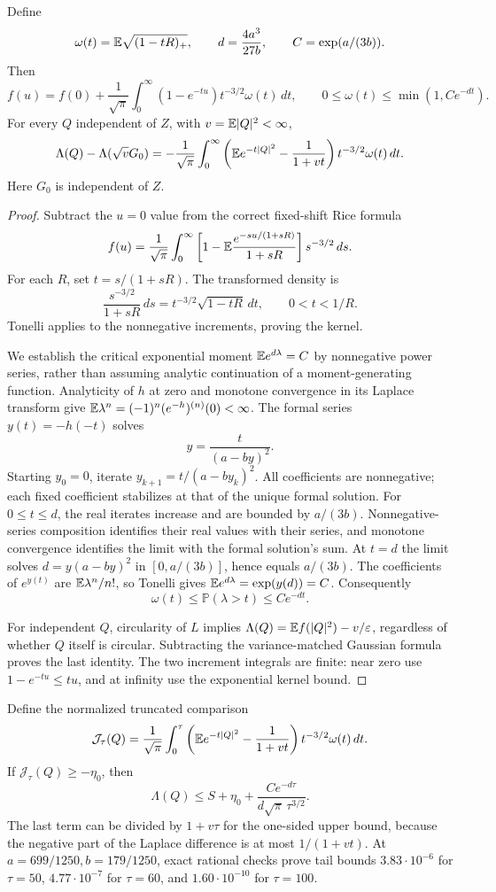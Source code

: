 \begin{theorem}
Define
\[
\omega(t)=\mathbb E\sqrt{(1-tR)_+},\qquad
d=\frac{4a^3}{27b},\qquad C=\exp(a/(3b)).
\]
Then
\[
f(u)=f(0)+\frac1{\sqrt\pi}\int_0^\infty
 (1-e^{-tu})t^{-3/2}\omega(t)\,dt,\qquad
0\le\omega(t)\le\min(1,Ce^{-dt}).
\]
For every \(Q\) independent of \(Z\), with \(v=\mathbb E|Q|^2<\infty\),
\[
\Lambda(Q)-\Lambda(\sqrt vG_0)
=-\frac1{\sqrt\pi}\int_0^\infty
\left(\mathbb E e^{-t|Q|^2}-\frac1{1+vt}\right)
t^{-3/2}\omega(t)\,dt .
\]
Here \(G_0\) is independent of \(Z\).
\end{theorem}
\begin{proof}
Subtract the \(u=0\) value from the correct fixed-shift Rice formula
\[
f(u)=\frac1{\sqrt\pi}\int_0^\infty
\left[1-\mathbb E\frac{e^{-su/(1+sR)}}{1+sR}\right]s^{-3/2}\,ds.
\]
For each \(R\), set \(t=s/(1+sR)\). The transformed density is
\[
\frac{s^{-3/2}}{1+sR}\,ds
=t^{-3/2}\sqrt{1-tR}\,dt,\qquad 0<t<1/R.
\]
Tonelli applies to the nonnegative increments, proving the kernel.

We establish the critical exponential moment
\(\mathbb E e^{d\lambda}=C\) by nonnegative power series, rather than
assuming analytic continuation of a moment-generating function.
Analyticity of \(h\) at zero and monotone convergence in its Laplace
transform give
\(\mathbb E\lambda^n=(-1)^n(e^{-h})^{(n)}(0)<\infty\).
The formal series \(y(t)=-h(-t)\) solves
\[
y=\frac{t}{(a-by)^2}.
\]
Starting \(y_0=0\), iterate
\(y_{k+1}=t/(a-by_k)^2\). All coefficients are nonnegative;
each fixed coefficient stabilizes at that of the unique formal
solution. For \(0\le t\le d\), the real iterates increase and are
bounded by \(a/(3b)\). Nonnegative-series composition identifies
their real values with their series, and monotone convergence
identifies the limit with the formal solution's sum. At \(t=d\)
the limit solves \(d=y(a-by)^2\) in \([0,a/(3b)]\), hence equals
\(a/(3b)\). The coefficients of \(e^{y(t)}\) are
\(\mathbb E\lambda^n/n!\), so Tonelli gives
\(\mathbb E e^{d\lambda}=\exp(y(d))=C\).
Consequently
\[
\omega(t)\le\mathbb P(\lambda>t)\le Ce^{-dt}.
\]

For independent \(Q\), circularity of \(L\) implies
\(\Lambda(Q)=\mathbb E f(|Q|^2)-v/\varepsilon\), regardless of whether \(Q\)
itself is circular. Subtracting the variance-matched Gaussian
formula proves the last identity. The two increment integrals are
finite: near zero use \(1-e^{-tu}\le tu\), and at infinity use the
exponential kernel bound.
\end{proof}

Define the normalized truncated comparison
\[
\mathcal J_\tau(Q)=\frac1{\sqrt\pi}\int_0^\tau
\left(\mathbb E e^{-t|Q|^2}-\frac1{1+vt}\right)
t^{-3/2}\omega(t)\,dt.
\]
If \(\mathcal J_\tau(Q)\ge-\eta_0\), then
\[
\Lambda(Q)\le S+\eta_0+
\frac{Ce^{-d\tau}}{d\sqrt\pi\,\tau^{3/2}}.
\]
The last term can be divided by \(1+v\tau\) for the one-sided
upper bound, because the negative part of the Laplace difference
is at most \(1/(1+vt)\).
At \(a=699/1250,b=179/1250\), exact rational checks prove tail
bounds \(3.83\cdot10^{-6}\) for \(\tau=50\),
\(4.77\cdot10^{-7}\) for \(\tau=60\), and
\(1.60\cdot10^{-10}\) for \(\tau=100\).

